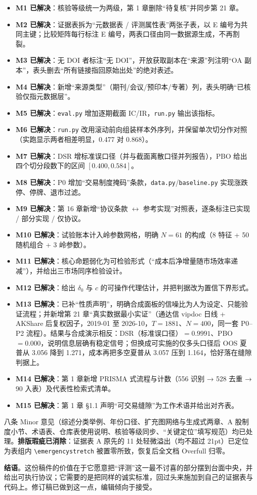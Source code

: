 \documentclass[11pt,a4paper]{ctexart}
\begin{document}
\begin{itemize}
  \item \textbf{M1 已解决}：核验等级统一为两级，第 1 章删除“待复核”并同步第 21 章。
  \item \textbf{M2 已解决}：证据表拆为“元数据表 / 评测属性表”两张子表，以 E 编号为共同主键；比较矩阵每行标注 E 编号，两表口径由同一数据源生成，不再割裂。
  \item \textbf{M3 已解决}：无 DOI 者标注“无 DOI”，开放获取副本在“来源”列注明“OA 副本”，表头删去“所有链接指回原始出处”的绝对表述。
  \item \textbf{M4 已解决}：新增“来源类型”（期刊/会议/预印本/专著）列，表头明确“\textsc{已核验}仅指元数据层”。
  \item \textbf{M5 已解决}：\texttt{eval.py} 增加逐期截面 IC/IR，\texttt{run.py} 输出该指标。
  \item \textbf{M6 已解决}：\texttt{run.py} 改用滚动前向组装样本外序列，并保留单次切分作对照（实跑显示两者相差明显，0.477 对 0.868）。
  \item \textbf{M7 已解决}：DSR 增标准误口径（并与截面离散口径并列报告），PBO 给出四个切分段数下的区间 $[0.400,0.584]$。
  \item \textbf{M8 已解决}：P0 增加“交易制度掩码”条款，\texttt{data.py}/\texttt{baseline.py} 实现涨跌停、停牌、退市过滤。
  \item \textbf{M9 已解决}：第 16 章新增“协议条款 $\leftrightarrow$ 参考实现”对照表，逐条标注已实现 / 部分实现 / 仅协议。
  \item \textbf{M10 已解决}：试验账本计入岭参数网格，明确 $N=61$ 的构成（8 特征 + 50 随机组合 + 3 岭参数）。
  \item \textbf{M11 已解决}：核心命题弱化为可检验形式（“成本后净增量随市场效率递减”），并给出三市场同序检验设计。
  \item \textbf{M12 已解决}：给出 $\delta_0$ 与 $c$ 的可操作代理估计，并把判据改为置信下界形式。
  \item \textbf{M13 已解决}：已补“性质声明”，明确合成面板的信噪比为人为设定、只能验证流程；并新增第 21 章“真实数据最小实证”（通达信 vipdoc 日线 + AKShare 后复权因子，2019-01 至 2026-10，$T=1881$、$N=400$，同一套 P0--P2 流程）。结果与合成演示相反：DSR（标准误口径）$=0.9991$、PBO $=0.000$，说明信息层确有稳定信号；但换成可实施的仅多头口径后 OOS 夏普从 3.056 降到 1.271，成本再把多空夏普从 3.057 压到 1.164，恰好落在缝隙判据上。
  \item \textbf{M14 已解决}：第 1 章新增 PRISMA 式流程与计数（556 识别 → 528 去重 → 90 入表）及代表性检索式清单。
  \item \textbf{M15 已解决}：第 1 章 §1.1 声明“可交易缝隙”为工作术语并给出对齐表。
\end{itemize}

\noindent 八条 Minor 意见（综述分类举例、年份口径、扩充图网络与生成式两章、A 股制度小节、术语表、仓库表使用说明、核验等级同步、“关键定位”填写规范）均已处理。\textbf{排版瑕疵已消除}：证据表 A 原先的 11 处轻微溢出（均不超过 21pt）已定位为表组内 \texttt{\textbackslash emergencystretch} 被置零所致，恢复后全文档 Overfull 归零。

\noindent\textbf{结语}。这份稿件的价值在于它愿意把“评测”这一最不讨喜的部分摆到台面中央，并给出可执行协议；它需要的是把同样的诚实标准，回过头来施加到自己的证据表与代码上。修订稿已做到这一点，编辑倾向于接受。
\end{document}
